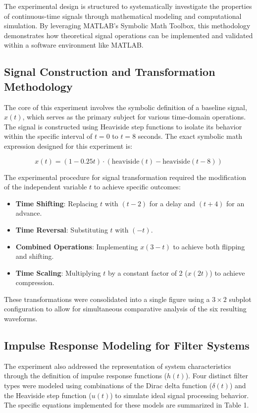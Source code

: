 The experimental design is structured to systematically investigate the properties of continuous-time signals through mathematical modeling and computational simulation. By leveraging MATLAB’s Symbolic Math Toolbox, this methodology demonstrates how theoretical signal operations can be implemented and validated within a software environment like MATLAB.

\subsection{Signal Construction and Transformation Methodology}
The core of this experiment involves the symbolic definition of a baseline signal, $x(t)$, which serves as the primary subject for various time-domain operations.  The signal is constructed using Heaviside step functions to isolate its behavior within the specific interval of $t = 0$ to $t = 8$ seconds. The exact symbolic math expression designed for this experiment is:

\begin{equation}
x(t) = (1 - 0.25t) \cdot (\text{heaviside}(t) - \text{heaviside}(t - 8))
\end{equation}

The experimental procedure for signal transformation required the modification of the independent variable $t$ to achieve specific outcomes:
\begin{itemize}
    \item \textbf{Time Shifting}: Replacing $t$ with $(t - 2)$ for a delay and $(t + 4)$ for an advance.
    \item \textbf{Time Reversal}: Substituting $t$ with $(-t)$.
    \item \textbf{Combined Operations}: Implementing $x(3-t)$ to achieve both flipping and shifting.
    \item \textbf{Time Scaling}: Multiplying $t$ by a constant factor of 2 ($x(2t)$) to achieve compression.
\end{itemize}

These transformations were consolidated into a single figure using a $3 \times 2$ subplot configuration to allow for simultaneous comparative analysis of the six resulting waveforms.

\subsection{Impulse Response Modeling for Filter Systems}
The experiment also addressed the representation of system characteristics through the definition of impulse response functions ($h(t)$). Four distinct filter types were modeled using combinations of the Dirac delta function ($\delta(t)$) and the Heaviside step function ($u(t)$) to simulate ideal signal processing behavior. The specific equations implemented for these models are summarized in Table 1.

